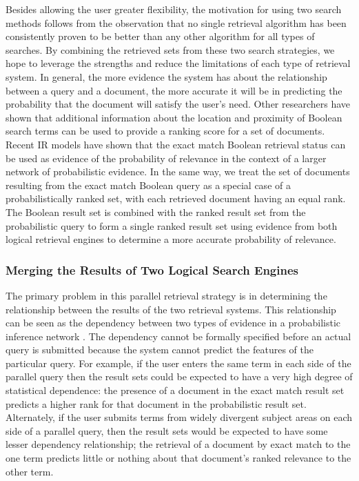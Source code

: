 Besides allowing the user greater flexibility, the motivation for
using two search methods follows from the observation that no single
retrieval algorithm has been consistently proven to be better than any
other algorithm for all types of searches. By combining the retrieved
sets from these two search strategies, we hope to leverage the
strengths and reduce the limitations of each type of retrieval system.
In general, the more evidence the system has about the relationship
between a query and a document, the more accurate it will be in
predicting the probability that the document will satisfy the user's
need\cite{BELKIN}.  Other researchers\cite{KEEN} have shown that
additional information about the location and proximity of Boolean
search terms can be used to provide a ranking score for a set of
documents.  Recent IR models have shown that the exact match Boolean
retrieval status can be used as evidence of the probability of
relevance in the context of a larger network of probabilistic
evidence\cite{FUHR,TURTLE90,TURTLE92}. In the same way, we treat the
set of documents resulting from the exact match Boolean query as a
special case of a probabilistically ranked set, with each retrieved
document having an equal rank. The Boolean result set is combined with
the ranked result set from the probabilistic query to form a single
ranked result set using evidence from both logical retrieval engines
to determine a more accurate probability of relevance.

\subsubsection{Merging the Results of Two Logical Search Engines}

The primary problem in this parallel retrieval strategy
is in determining the relationship between the results of the two
retrieval systems. This relationship can be seen as the dependency
between two types of evidence in a probabilistic inference network
\cite{FUHR,TURTLE90}. The dependency cannot be formally specified
before an actual query is submitted because the system cannot predict
the features of the particular query.  For example, if the user enters
the same term in each side of the parallel query then the result sets
could be expected to have a very high degree of statistical
dependence: the presence of a document in the exact match result set
predicts a higher rank for that document in the probabilistic result
set. Alternately, if the user submits terms from widely divergent
subject areas on each side of a parallel query, then the result sets
would be expected to have some lesser dependency relationship; the
retrieval of a document by exact match to the one term predicts little
or nothing about that document's ranked relevance to the other term.

